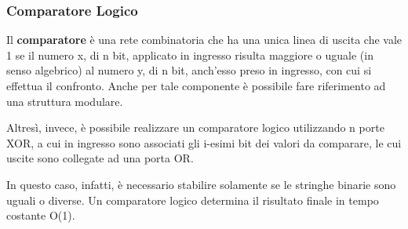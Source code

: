 \documentclass[12pt]{article} %
\begin{document}
\subsubsection{Comparatore Logico}
Il \textbf{comparatore} è una rete combinatoria che ha una unica linea di uscita che vale 1 se il numero x, di n bit, applicato in ingresso risulta maggiore o uguale (in senso algebrico) al numero y, di n bit, anch’esso preso in ingresso, con cui si effettua il confronto.
Anche per tale componente è possibile fare riferimento ad una struttura modulare. \par\medskip\noindent
Altresì, invece, è possibile realizzare un comparatore logico utilizzando n porte XOR, a cui in ingresso sono associati gli i-esimi bit dei valori da comparare, le cui uscite sono collegate ad una porta OR.\par\medskip\noindent
In questo caso, infatti, è necessario stabilire solamente se le stringhe binarie sono uguali o diverse. Un comparatore logico determina il risultato finale in tempo costante O(1).
\end{document}
